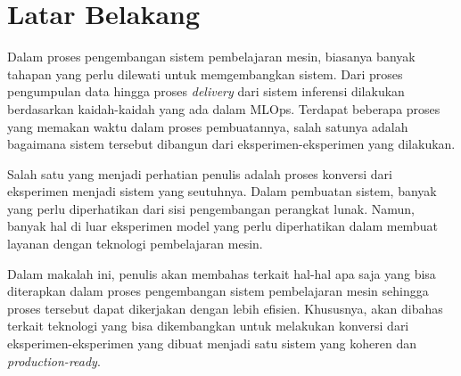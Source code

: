 \section{Latar Belakang}

Dalam proses pengembangan sistem pembelajaran mesin, biasanya banyak tahapan yang perlu dilewati untuk memgembangkan sistem.
Dari proses pengumpulan data hingga proses \textit{delivery} dari sistem inferensi dilakukan berdasarkan kaidah-kaidah yang ada dalam MLOps.
Terdapat beberapa proses yang memakan waktu dalam proses pembuatannya, salah satunya adalah bagaimana sistem tersebut dibangun dari eksperimen-eksperimen yang dilakukan.

Salah satu yang menjadi perhatian penulis adalah proses konversi dari eksperimen menjadi sistem yang seutuhnya.
Dalam pembuatan sistem, banyak yang perlu diperhatikan dari sisi pengembangan perangkat lunak.
Namun, banyak hal di luar eksperimen model yang perlu diperhatikan dalam membuat layanan dengan teknologi pembelajaran mesin.

Dalam makalah ini, penulis akan membahas terkait hal-hal apa saja yang bisa diterapkan dalam proses pengembangan sistem pembelajaran mesin sehingga proses tersebut dapat dikerjakan dengan lebih efisien.
Khususnya, akan dibahas terkait teknologi yang bisa dikembangkan untuk melakukan konversi dari eksperimen-eksperimen yang dibuat menjadi satu sistem yang koheren dan \textit{production-ready}.